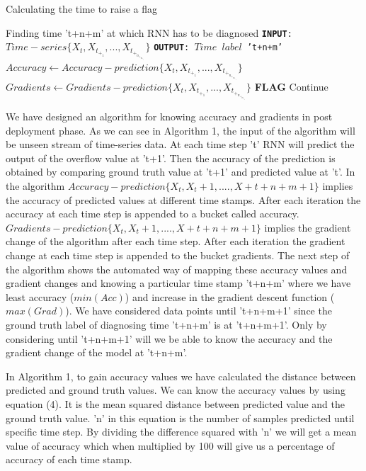 \documentclass[sigconf,authordraft]{acmart}
\begin{document}
\begin{algorithm}
\caption{Calculating the time to raise a flag}
\begin{algorithmic}
 \REQUIRE Finding time 't+n+m' at which RNN has to be diagnosed
 \STATE \texttt{\textbf{INPUT}: $Time-series \{X_t, X_t_+_1, ..., X_t_+_n_+_m_+_1\}$}
 \STATE \texttt{\textbf{OUTPUT}: $Time$ $label$ 't+n+m'}
 \STATE $Accuracy \leftarrow Accuracy-prediction\{X_t, X_t_+_1, ..., X_t_+_n_+_m_+_1\}$
 \STATE $Gradients \leftarrow Gradients-prediction\{X_t, X_t_+_1, ..., X_t_+_n_+_m_+_1\}$
            \STATE \textbf{FLAG}
         \ELSE
             \STATE Continue
    \ENDIF
\ENDFOR
\end{algorithmic}
\end{algorithm}


We have designed an algorithm for knowing accuracy and gradients in post deployment phase. As we can see in Algorithm 1, the input of the algorithm will be unseen stream of time-series data. At each time step 't' RNN will predict the output of the overflow value at 't+1'. Then the accuracy of the prediction is obtained by comparing ground truth value at 't+1' and predicted value at 't'. In the algorithm $Accuracy-prediction \{X_t, X_t+1, ...., X+t+n+m+1\}$ implies the accuracy of predicted values at different time stamps. After each iteration the accuracy at each time step is appended to a bucket called accuracy. $Gradients-prediction \{X_t, X_t+1, ...., X+t+n+m+1\}$ implies the gradient change of the algorithm after each time step. After each iteration the gradient change at each time step is appended to the bucket gradients. The next step of the algorithm shows the automated way of mapping these accuracy values and gradient changes and knowing a particular time stamp 't+n+m' where we have least accuracy ($min(Acc)$) and increase in the gradient descent function ($max(Grad)$). We have considered data points until 't+n+m+1' since the ground truth label of diagnosing time 't+n+m' is at 't+n+m+1'. Only by considering until 't+n+m+1' will we be able to know the accuracy and the gradient change of the model at 't+n+m'.

In Algorithm 1, to gain accuracy values we have calculated the distance between predicted and ground truth values. We can know the accuracy values by using equation (4). It is the mean squared distance between predicted value and the ground truth value. 'n' in this equation is the number of samples predicted until specific time step. By dividing the difference squared with 'n' we will get a mean value of accuracy which when multiplied by 100 will give us a percentage of accuracy of each time stamp.
\end{document}
